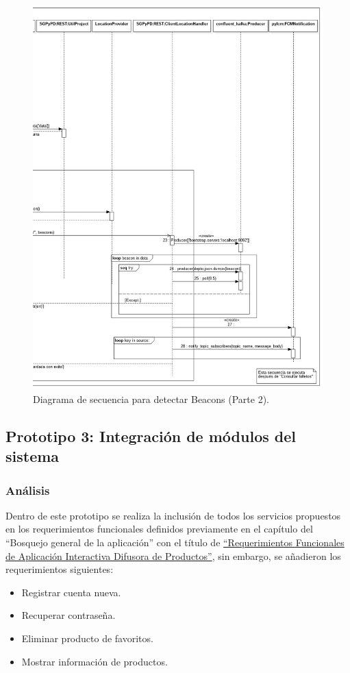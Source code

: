 \FloatBarrier
\begin{figure}[htbp!]
		\centering
			\includegraphics[width=.9 \textwidth]{imagenes/Diagramas_UserApp/Nuevos_diagramas/detectarBeacons2P2}
		\caption{Diagrama de secuencia para detectar Beacons (Parte 2).}
		\label{image:detecta22}
\end{figure}
\FloatBarrier

\subsection{Prototipo 3: Integración de módulos del sistema}
\subsubsection{Análisis}
\hypertarget{analisis}{}
Dentro de este prototipo se realiza la inclusión de todos los servicios propuestos en los requerimientos funcionales definidos previamente en el capítulo del ``Bosquejo general de la aplicación''  con el título de \hyperlink{RFAIDP}{``Requerimientos Funcionales de Aplicación Interactiva Difusora de Productos''}, sin embargo, se añadieron los requerimientos siguientes:\\
\begin{itemize}
\item Registrar cuenta nueva.
\item Recuperar contraseña. 
\item Eliminar producto de favoritos.
\item Mostrar información de productos.
\end{itemize}

